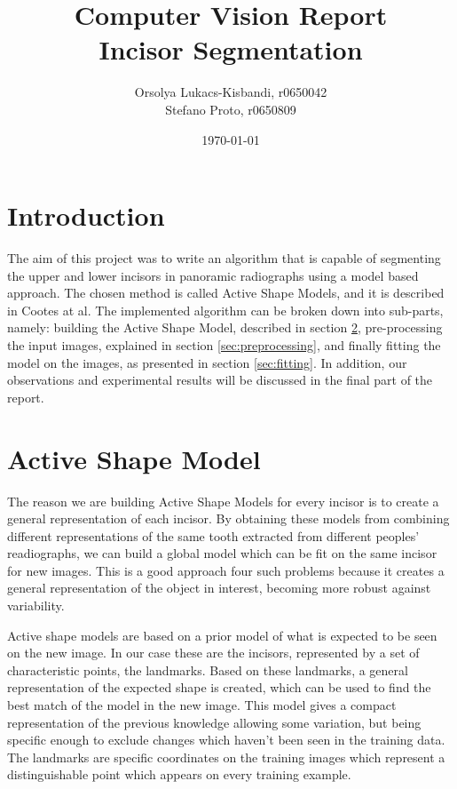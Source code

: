\documentclass[a4paper]{article}
\author{Orsolya Lukacs-Kisbandi, r0650042 \\
		Stefano Proto, r0650809}
\title{ \textbf{Computer Vision Report \\ 
		Incisor Segmentation} }
\date{\today}
\begin{document}
\maketitle
\thispagestyle{empty}
\newpage
\setcounter{page}{1}
\tableofcontents
\newpage

\section{Introduction}
The aim of this project was to write an algorithm that is capable of segmenting the upper and lower incisors in panoramic radiographs using a model based approach.
The chosen method is called Active Shape Models, and it is described in \cite{cootes1} Cootes at al. The implemented algorithm can be broken down into sub-parts, namely: building the Active Shape Model, described in section \ref{sec:modelling}, pre-processing the input images, explained in section \ref{sec:preprocessing}, and finally fitting the model on the images, as presented in section \ref{sec:fitting}. In addition, our observations and experimental results will be discussed in the final part of the report. 

\section{Active Shape Model}\label{sec:modelling}



The reason we are building Active Shape Models for every incisor is to create a general representation of each incisor.
By obtaining these models from combining different representations of the same tooth extracted from different peoples' readiographs, we can build a global model which can be fit on the same incisor for new images. This is a good approach four such problems because it creates a general representation of the object in interest, becoming more robust against variability.

Active shape models are based on a prior model of what is expected to be seen on the new image. In our case these are the incisors, represented by a set of characteristic points, the landmarks. Based on these landmarks, a general representation of the expected shape is created, which can be used to find the best match of the model in the new image. This model gives a compact representation of the previous knowledge allowing some variation, but being specific enough to exclude changes which haven't been seen in the training data. The landmarks are specific coordinates on the training images which represent a distinguishable point which appears on every training example.
\end{document}
